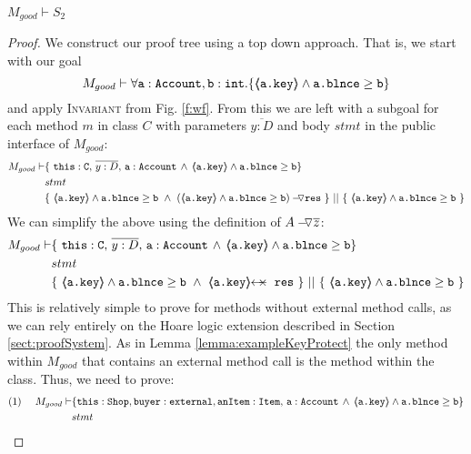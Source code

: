 \begin{lemma}
$M_{good} \vdash S_2$
\end{lemma}
\begin{proof}
We construct our proof tree using a top down approach.  That is, we start with our goal
$$M_{good} \vdash \TwoStatesN {\prg{a}:\prg{Account}, \prg{b} : \prg{int}}  {\inside{\prg{a.key}} \wedge \prg{a.blnce} \geq \prg{b}}$$
and apply  \textsc{Invariant} from Fig. \ref{f:wf}.
From this we are left with a subgoal for each method $m$ in  class $C$ with parameters $\overline{y:D}$ and body $stmt$ in the public interface of $M_{good}$:
\small
\begin{align*}
M_{good} \vdash
		& \{ \ \prg{this}:\prg{C},\, \overline{y:D},\, \prg{a}:\prg{Account}\, \wedge\,
		   {\inside{\prg{a.key}} \wedge \prg{a.blnce} \geq \prg{b}}\} \\
		& stmt\ \\
		& \{\ {\inside{\prg{a.key}} \wedge \prg{a.blnce} \geq \prg{b}}\ \wedge\ {\PushASLong {\prg{res}} {(\inside{\prg{a.key}} \wedge \prg{a.blnce} \geq \prg{b})}}\ \}\ ||\ \{\ {\inside{\prg{a.key}} \wedge \prg{a.blnce} \geq \prg{b}} \ 			\} 
\end{align*}
\normalsize
We can simplify the above using the definition of $\PushASLong{\overline{z}}{A}$:
\small
\begin{align*}
M_{good} \vdash
		& \{ \ \prg{this}:\prg{C},\, \overline{y:D},\, \prg{a}:\prg{Account}\, \wedge\,
		   {\inside{\prg{a.key}} \wedge \prg{a.blnce} \geq \prg{b}}\} \\
		& stmt\ \\
		& \{\ {\inside{\prg{a.key}} \wedge \prg{a.blnce} \geq \prg{b}}\ \wedge\ \protectedFrom{\prg{a.key}}{\prg{res}}\ \}\ ||\ \{\ {\inside{\prg{a.key}} \wedge \prg{a.blnce} \geq \prg{b}} \ 			\} 
\end{align*}
\normalsize
This is relatively simple to prove for methods without external method calls, as we can rely entirely on the Hoare logic extension described in Section \ref{sect:proofSystem}. As in Lemma \ref{lemma:exampleKeyProtect} the only  method within $M_{good}$ that contains 
an external method call is  the  method within the  class. Thus, we need to prove:
\small
\begin{align*}
\text{(1)}  \ \ \ \ M_{good} \vdash 
		&	\{  \prg{this}:\prg{Shop}, \prg{buyer} : \prg{external}, \prg{anItem} : \prg{Item},\, \prg{a}:\prg{Account}\,\wedge\, 
				{\inside{\prg{a.key}} \wedge \prg{a.blnce} \geq \prg{b}}\} \\
		& stmt\ \\  

\end{align*}
\end{proof}

